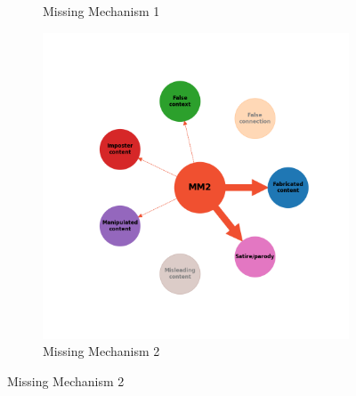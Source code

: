 \documentclass[twocolumn]{article}
\begin{document}
\begin{figure}
\begin{subfigure}{0.28\textwidth}
    \caption{Missing Mechanism 1}
    \label{fig:rebuttal_mm1}
\end{subfigure}
\hfill
\begin{subfigure}{0.28\textwidth}
    \includegraphics[width=\textwidth]{rebuttal_MM2.png}
    \caption{Missing Mechanism 2}
    \label{fig:rebuttal_mm2}
\end{subfigure}


\end{figure}
\end{document}
